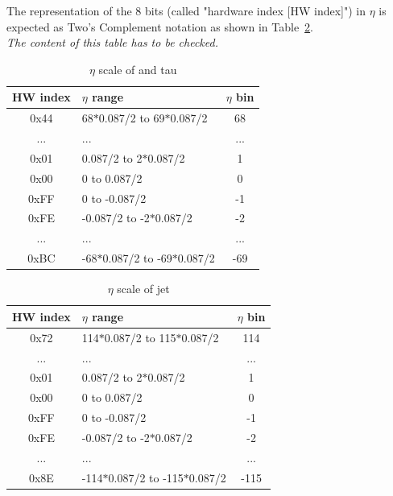 The representation of the 8 bits (called "hardware index [HW index]") in $\eta$ is expected as Two's Complement notation as shown in Table~\ref{tab:gtl:calo_eta_scale}.\\
\textit{The content of this table has to be checked.}
 
\begin{table}[htdp]
\caption{$\eta$ scale of \egamma and tau}
\begin{center}
\begin{tabular}{|c|l|c|}\hline
\textbf{HW index}& \textbf{$\eta$ range} & \textbf{$\eta$ bin}\\\hline\hline
0x44 & 68$*$0.087/2 to 69$*$0.087/2 & 68\\\hline
... & ... & ...\\\hline
0x01 & 0.087/2 to 2$*$0.087/2 & 1\\\hline
0x00 & 0 to 0.087/2 & 0\\\hline
0xFF & 0 to -0.087/2 & -1\\\hline
0xFE & -0.087/2 to -2$*$0.087/2 & -2\\\hline
... & ... & ...\\\hline
0xBC & -68$*$0.087/2 to -69$*$0.087/2 & -69\\\hline
\end{tabular}
\end{center}
\label{tab:gtl:calo_eta_scale}
\end{table}

\begin{table}[htdp]
\caption{$\eta$ scale of jet}
\begin{center}
\begin{tabular}{|c|l|c|}\hline
\textbf{HW index}& \textbf{$\eta$ range} & \textbf{$\eta$ bin}\\\hline\hline
0x72 & 114$*$0.087/2 to 115$*$0.087/2 & 114\\\hline
... & ... & ...\\\hline
0x01 & 0.087/2 to 2$*$0.087/2 & 1\\\hline
0x00 & 0 to 0.087/2 & 0\\\hline
0xFF & 0 to -0.087/2 & -1\\\hline
0xFE & -0.087/2 to -2$*$0.087/2 & -2\\\hline
... & ... & ...\\\hline
0x8E & -114$*$0.087/2 to -115$*$0.087/2 & -115\\\hline
\end{tabular}
\end{center}
\label{tab:gtl:calo_eta_scale}
\end{table}

